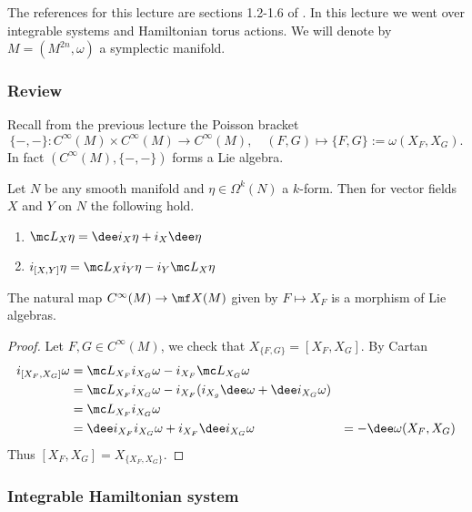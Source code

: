 The references for this lecture are sections 1.2-1.6 of \cite{Evans_2023}.
In this lecture we went over integrable systems and Hamiltonian torus actions.
We will denote by $M=(M^{2n},\omega)$ a symplectic manifold.

\subsubsection*{Review}

Recall from the previous lecture the Poisson bracket
\[\{-,-\}:C^\infty(M)\times C^\infty(M)\to C^\infty(M),\quad (F,G)\mapsto\{F,G\}:=\omega(X_F,X_G).\]
In fact $(C^\infty(M),\{-,-\})$ forms a Lie algebra.


\begin{thm}
    Let $N$ be any smooth manifold and $\eta\in\Omega^k(N)$ a $k$-form.
    Then for vector fields $X$ and $Y$ on $N$ the following hold.
    \begin{enumerate}
        \item $\mc L_X\eta=\dee i_X\eta+i_X\dee\eta$
        \item $i_{[X,Y]}\eta=\mc L_Xi_Y\eta-i_Y\mc L_X\eta$
    \end{enumerate}
\end{thm}

\begin{cor}
    The natural map $C^\infty(M)\to\mf X(M)$ given by $F\mapsto X_F$ is a morphism of Lie algebras.
\end{cor}

\begin{proof}
    Let $F,G\in C^\infty(M)$, we check that $X_{\{F,G\}}=[X_F,X_G]$.
    By Cartan
    \begin{align*}
        i_{[X_F,X_G]}\omega&=\mc L_{X_F}i_{X_G}\omega-i_{X_F}\mc L_{X_G}\omega\\
        &=\mc L_{X_F}i_{X_G}\omega-i_{X_F}(i_{X_g}\dee\omega+\dee i_{X_G}\omega)\\
        &=\mc L_{X_F}i_{X_G}\omega\\
        &=\dee i_{X_F}i_{X_G}\omega+i_{X_F}\dee i_{X_G}\omega
        &=-\dee\omega(X_F,X_G)
    \end{align*}
    Thus $[X_F,X_G]=X_{\{X_F,X_G\}}$.
\end{proof}

\subsubsection*{Integrable Hamiltonian system}

